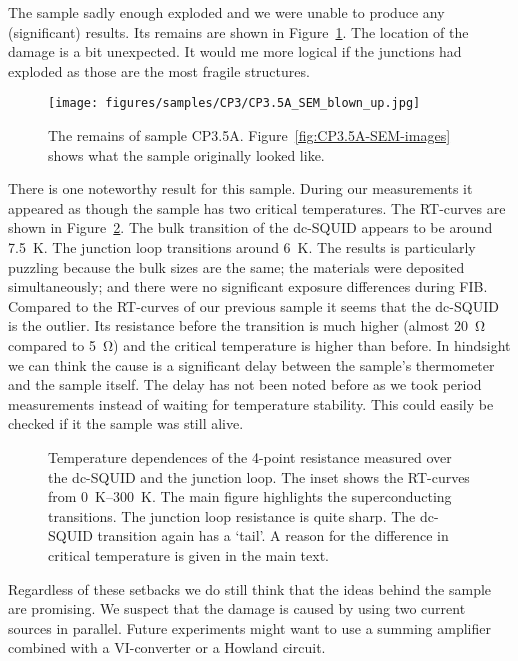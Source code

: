 The sample sadly enough exploded and we were unable to produce any (significant) results. Its remains are shown in Figure~\ref{fig:CP3.5A-remains}. The location of the damage is a bit unexpected. It would me more logical if the junctions had exploded as those are the most fragile structures.

\begin{figure}[ht!]	
	\centering
	\texttt{[image: figures/samples/CP3/CP3.5A\_SEM\_blown\_up.jpg]}
	\caption{The remains of sample CP3.5A. Figure~\ref{fig:CP3.5A-SEM-images} shows what the sample originally looked like.}
	\label{fig:CP3.5A-remains}
\end{figure}

There is one noteworthy result for this sample. During our measurements it appeared as though the sample has two critical temperatures. The RT-curves are shown in Figure~\ref{fig:CP3.5A_RT_curves}. The bulk transition of the dc-SQUID appears to be around \qty{7.5}{\kelvin}. The junction loop transitions around \qty{6}{\kelvin}. The results is particularly puzzling because the bulk sizes are the same; the materials were deposited simultaneously; and there were no significant exposure differences during FIB. Compared to the RT-curves of our previous sample it seems that the dc-SQUID is the outlier. Its resistance before the transition is much higher (almost \qty{20}{\ohm} compared to \qty{5}{\ohm}) and the critical temperature is higher than before. In hindsight we can think the cause is a significant delay between the sample's thermometer and the sample itself. The delay has not been noted before as we took period measurements instead of waiting for temperature stability. This could easily be checked if it the sample was still alive.

\begin{figure}[ht!]
	\centering
	
	\caption{Temperature dependences of the 4-point resistance measured over the dc-SQUID and the junction loop. The inset shows the RT-curves from \qtyrange{0}{300}{\kelvin}. The main figure highlights the superconducting transitions. The junction loop resistance is quite sharp. The dc-SQUID transition again has a `tail'. A reason for the difference in critical temperature is given in the main text.}
	\label{fig:CP3.5A_RT_curves}
\end{figure}

Regardless of these setbacks we do still think that the ideas behind the sample are promising. We suspect that the damage is caused by using two current sources in parallel. Future experiments might want to use a summing amplifier combined with a VI-converter or a Howland circuit.